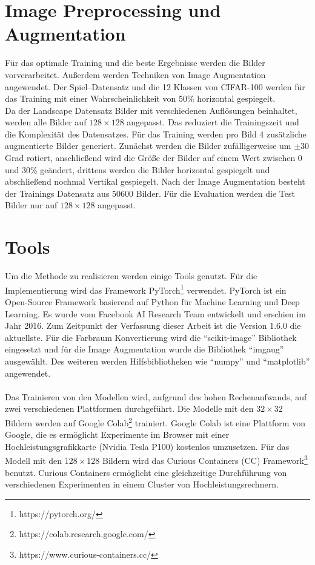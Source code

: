 \section{Image Preprocessing und Augmentation}
Für das optimale Training und die beste Ergebnisse werden die Bilder vorverarbeitet. Außerdem werden Techniken von Image Augmentation angewendet.
Der Spiel–Datensatz und die 12 Klassen von CIFAR-100 werden für das Training mit einer Wahrscheinlichkeit von 50\% horizontal gespiegelt.
\\
Da der Landscape Datensatz Bilder mit verschiedenen Auflösungen beinhaltet, werden alle Bilder auf $ 128 \times 128 $ angepasst. Das 
reduziert die Trainingszeit und die Komplexität des Datensatzes. 
Für das Training werden pro Bild 4 zusätzliche augmentierte Bilder generiert. Zunächst werden die Bilder zufälligerweise um $\pm 30$ Grad rotiert,
anschließend wird die Größe der Bilder auf einem Wert zwischen 0 und 30\% geändert, %
drittens werden die Bilder horizontal gespiegelt und abschließend nochmal Vertikal gespiegelt. 
Nach der Image Augmentation besteht der Trainings Datensatz aus 50600 Bilder.
Für die Evaluation werden die Test Bilder nur auf $ 128 \times 128 $ angepasst.

\section{Tools}
Um die Methode zu realisieren werden einige Tools genutzt. Für die Implementierung wird das Framework 
PyTorch\footnote{https://pytorch.org/}\label{tool:pytorch} verwendet. PyTorch ist ein Open-Source Framework basierend auf Python für Machine Learning und 
Deep Learning. Es wurde vom Facebook AI Research Team entwickelt und erschien im Jahr 2016. Zum Zeitpunkt der Verfassung dieser Arbeit ist 
die Version 1.6.0 die aktuellste. Für die Farbraum Konvertierung wird die ``scikit-image'' Bibliothek eingesetzt und für die Image Augmentation 
wurde die Bibliothek ``imgaug'' ausgewählt. Des weiteren werden Hilfsbibliotheken wie ``numpy'' und ``matplotlib'' angewendet.
\\
\\
Das Trainieren von den Modellen wird, aufgrund des hohen Rechenaufwands, auf zwei verschiedenen Plattformen durchgeführt. Die Modelle mit den
$32 \times 32$ Bildern werden auf Google Colab\footnote{https://colab.research.google.com/} trainiert. Google Colab ist eine Plattform von 
Google, die es ermöglicht Experimente im Browser mit einer Hochleistungsgrafikkarte (Nvidia Tesla P100) kostenlos umzusetzen. Für das Modell mit den 
$128 \times 128$ Bildern
wird das Curious Containers (CC) Framework\footnote{https://www.curious-containers.cc/} benutzt. Curious Containers ermöglicht eine 
gleichzeitige Durchführung von verschiedenen Experimenten in einem Cluster von Hochleistungsrechnern.


